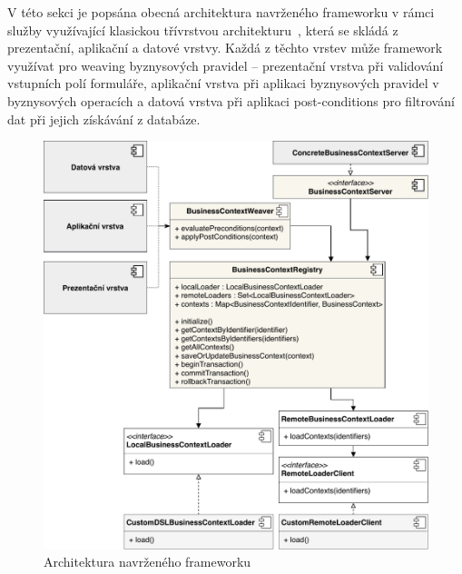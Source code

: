 V této sekci je popsána obecná architektura navrženého frameworku v rámci služby využívající
klasickou třívrstvou architekturu~\cite{fowler2002patterns}, která se skládá z prezentační,
aplikační a datové vrstvy. Každá z těchto vrstev může framework využívat pro weaving byznysových pravidel
-- prezentační vrstva při validování vstupních polí formuláře, aplikační vrstva při
aplikaci byznysových pravidel v byznysových operacích a datová vrstva při aplikaci post-conditions pro
filtrování dat při jejich získávání z databáze.

\begin{figure}
    \centering
    \includegraphics[keepaspectratio=true, width=\linewidth]{figures/business-context-registry.pdf}
    \caption{Architektura navrženého frameworku}
    \label{fig:business-context-registry}
\end{figure}

